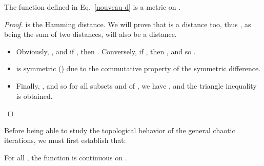 \documentclass{article}
\begin{document}
\begin{proposition}
The function  defined in Eq.~\ref{nouveau d} is a metric on .
\end{proposition}

\begin{proof}
  is the Hamming distance. We will prove that  is a distance
too, thus , as being the sum of two distances, will also be a distance.
 \begin{itemize}
\item Obviously, , and if , then 
. Conversely, if , then 
, and so .
 \item  is symmetric 
() due to the commutative property
of the symmetric difference. 
\item Finally, , 
and so for all subsets  and  of , 
we have , and the triangle
inequality is obtained.
 \end{itemize}
\end{proof}


Before being able to study the topological behavior of the general 
chaotic iterations, we must first establish that:

\begin{proposition}
 For all , the function  is continuous on 
.
\end{proposition}
\end{document}
